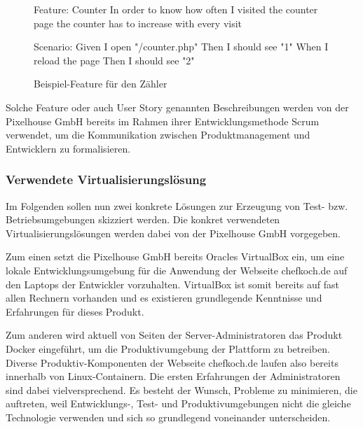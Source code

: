 \begin{figure}[!ht]
  \begin{center}
    \begin{gherkincode}
Feature: Counter
  In order to know how often I visited the counter page
  the counter has to increase with every visit

  Scenario:
    Given I open "/counter.php"
    Then I should see "1"
    When I reload the page
    Then I should see "2"

    \end{gherkincode}
    \caption{Beispiel-Feature für den Zähler}
  \end{center}
\end{figure}

Solche Feature oder auch User Story genannten Beschreibungen werden von der Pixelhouse GmbH bereits im Rahmen ihrer Entwicklungsmethode Scrum verwendet, um die Kommunikation zwischen Produktmanagement und Entwicklern zu formalisieren.

\subsubsection{Verwendete Virtualisierungslösung}

Im Folgenden sollen nun zwei konkrete Lösungen zur Erzeugung von Test- bzw. Betriebsumgebungen skizziert werden. Die konkret verwendeten Virtualisierungslösungen werden dabei von der Pixelhouse GmbH vorgegeben.

Zum einen setzt die Pixelhouse GmbH bereits Oracles VirtualBox ein, um eine lokale Entwicklungsumgebung für die Anwendung der Webseite chefkoch.de auf den Laptops der Entwickler vorzuhalten. VirtualBox ist somit bereits auf fast allen Rechnern vorhanden und es existieren grundlegende Kenntnisse und Erfahrungen für dieses Produkt.

Zum anderen wird aktuell von Seiten der Server-Administratoren das Produkt Docker eingeführt, um die Produktivumgebung der Plattform zu betreiben. Diverse Produktiv-Komponenten der Webseite chefkoch.de laufen also bereits innerhalb von Linux-Containern. Die ersten Erfahrungen der Administratoren sind dabei vielversprechend. Es besteht der Wunsch, Probleme zu minimieren, die auftreten, weil Entwicklungs-, Test- und Produktivumgebungen nicht die gleiche Technologie verwenden und sich so grundlegend voneinander unterscheiden.
